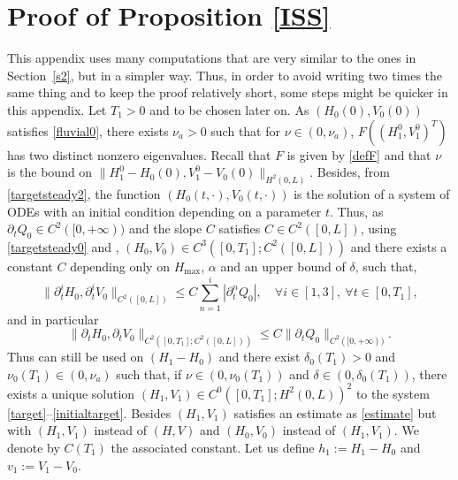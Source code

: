 \documentclass[11pt]{article}
\numberwithin{equation}{section}
\theoremstyle{definition}
\begin{document}
\section{Proof of Proposition \ref{ISS}}
\label{AppendixISS}
This appendix uses many computations that are very similar to the {ones}
in Section~\ref{s2}, but in a simpler way. Thus, in order to avoid writing two times the same thing and to keep the proof relatively short, some steps might be quicker in this appendix.
Let $T_{1}\!>\!0$ and to be chosen later on. As $(H_{0}(0),V_{0}(0))$ satisfies \eqref{fluvial0}, there exists \hbox{$\nu_{a}\!>\!0$} such that for $\nu\in(0,\nu_{a})$, $F((H_{1}^{0},V_{1}^{0})^{T})$
has two distinct nonzero eigenvalues. Recall that $F$ is given by \eqref{defF} and that $\nu$ is the bound on \hbox{$\lVert H_{1}^{0}-H_{0}(0),V_{1}^{0}-V_{0}(0)\rVert_{H^{2}(0,L)}$}.
Besides, from \eqref{targetsteady2}, the function $(H_{0}(t,\cdot),V_{0}(t,\cdot))$ is the solution of a system of {ODEs} with an initial condition depending on a parameter $t$. Thus, as $\partial_{t}Q_{0}\in C^{2}([0,+\infty))$ and the slope $C$ satisfies $C\in C^{2}([0,L])$,
using \eqref{targetsteady0} and \cite[Chap.\,5, Th.\,3.1]{Hartman}, $(H_{0},V_{0})\in C^{3}([0,T_{1}]; C^{2}([0,L]))$ and there exists a constant $C$ depending only on $H_{\max}$, $\alpha$ {and
an upper bound of $\delta$,} such that,
{\begin{equation}
\label{boundH0V0}
\lVert\partial_{t}^{i}H_{0},\partial_{t}^{i}V_{0}\rVert_{C^{2}([0,L])}\leq C\sum\limits_{n=1}^{i}\left|\partial_{t}^{n}Q_{0}\right|,\quad\forall i\in[1,3],\ \forall t\in[0,T_{1}],
\end{equation} and in particular}
\begin{equation}
\lVert\partial_{t} H_{0},\partial_{t} V_{0}\rVert_{C^{2}([0,T_{1}];C^{2}([0,L]))}\leq C \lVert\partial_{t}Q_{0}\rVert_{C^{{2}}([0,+\infty))}.
\label{H0V0bound}
\end{equation}
Thus \cite[Th.\,2.1]{Wang} can still be used
{on $(H_{1}-H_{0})$}
and
there exist $\delta_{0}(T_{1})>0$ and $\nu_{0}(T_{1})\in(0,\nu_{a})$ such that, if $\nu\in(0,\nu_{0}(T_{1}))$ and $\delta\in(0,\delta_{0}(T_{1}))$, there exists a unique solution $(H_{1},V_{1})\in C^{0}([0,T_{1}];H^{2}(0,L))^{{2}}$ to the system \eqref{target}--\eqref{initialtarget}.
Besides $(H_{1},V_{1})$ satisfies an estimate as \eqref{estimate} but with $(H_{1},V_{1})$ instead of $(H,V)$ and $(H_{0},V_{0})$ instead of $(H_{1},V_{1})$. We denote by $C(T_{1})$ the associated constant.
Let us define $h_{1}:=H_{1}-H_{0}$ and $v_{1}:=V_{1}-V_{0}$.
\end{document}
